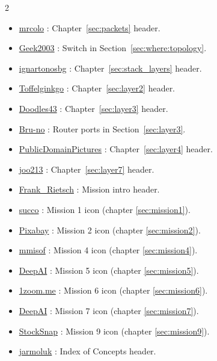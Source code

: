 \begin{multicols}{2}
\begin{itemize}
\item \href{https://pixabay.com/photos/container-goods-ship-port-cargo-4675851/}{mrcolo} : Chapter~\ref{sec:packets} header.
\item \href{https://commons.wikimedia.org/wiki/File:2550T-PWR-Front.jpg}{Geek2003} : Switch in Section~\ref{sec:where:topology}.
\item \href{https://pixabay.com/photos/vegetable-onion-flavor-ingredient-6829271/}{ignartonosbg} : Chapter~\ref{sec:stack_layers} header.
\item \href{https://commons.wikimedia.org/wiki/File:Winter_2004_DreamHack_LAN_Party.jpg}{Toffelginkgo} : Chapter~\ref{sec:layer2} header.
\item \href{https://pixabay.com/photos/golden-gate-bridge-san-francisco-1549662/}{Doodles43} : Chapter~\ref{sec:layer3} header.
\item \href{https://pixabay.com/photos/network-edp-plug-patch-cord-4393368/}{Bru-no} : Router ports in Section~\ref{sec:layer3}.
\item \href{https://pixabay.com/photos/green-plastic-pipes-culvert-water-72772/}{PublicDomainPictures} : Chapter~\ref{sec:layer4} header.
\item \href{https://pixabay.com/vectors/logo-icon-icon-collection-flat-1727647/}{joo213} : Chapter~\ref{sec:layer7} header.
\item \href{https://pixabay.com/illustrations/ai-generated-mars-astronaut-9072070/}{Frank\_Rietsch} : Mission intro header.
\item \href{https://pixabay.com/photos/abacus-calculate-mathematics-485704/}{succo} : Mission 1 icon (chapter \ref{sec:mission1}).
\item \href{https://pixabay.com/photos/stairway-spiral-stairs-architecture-5551641/}{Pixabay} : Mission 2 icon (chapter \ref{sec:mission2}).
\item \href{https://pixabay.com/photos/raisting-satellite-reception-signal-1010862/}{mmisof} : Mission 4 icon (chapter \ref{sec:mission4}).
\item \href{https://deepai.org/machine-learning-model/text2img}{DeepAI} : Mission 5 icon (chapter \ref{sec:mission5}).
\item \href{https://www.1zoom.me/en/wallpaper/588855/z3815.7/1080x1920}{1zoom.me} : Mission 6 icon (chapter \ref{sec:mission6}).
\item \href{https://deepai.org/machine-learning-model/text2img}{DeepAI} : Mission 7 icon (chapter \ref{sec:mission7}).
\item \href{https://pixabay.com/photos/architecture-building-infrastructure-2566798/}{StockSnap} : Mission 9 icon (chapter \ref{sec:mission9}).
\item \href{https://pixabay.com/photos/list-surnames-table-personal-data-428312/}{jarmoluk} : Index of Concepts header.
\end{itemize}
\end{multicols}

